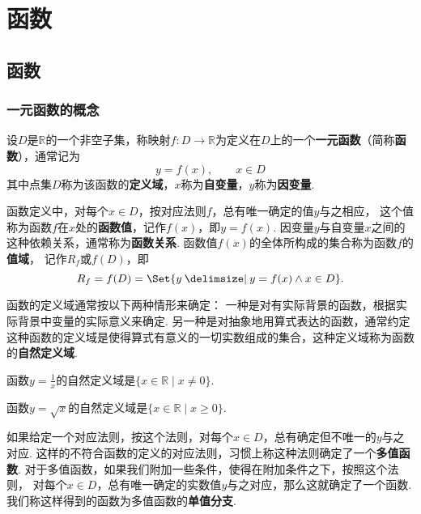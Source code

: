 \chapter{函数}
\section{函数}
\subsection{一元函数的概念}
\begin{definition}
设\(D\)是\(\mathbb{R}\)的一个非空子集，称映射\(f\colon D \to \mathbb{R}\)为定义在\(D\)上的一个\textbf{一元函数}（简称\textbf{函数}），通常记为\[
y = f(x), \qquad x \in D
\]其中点集\(D\)称为该函数的\textbf{定义域}，\(x\)称为\textbf{自变量}，\(y\)称为\textbf{因变量}.

函数定义中，对每个\(x \in D\)，按对应法则\(f\)，总有唯一确定的值\(y\)与之相应，%
这个值称为函数\(f\)在\(x\)处的\textbf{函数值}，记作\(f(x)\)，即\(y=f(x)\).
因变量\(y\)与自变量\(x\)之间的这种依赖关系，通常称为\textbf{函数关系}.
函数值\(f(x)\)的全体所构成的集合称为函数\(f\)的\textbf{值域}，%
记作\(R_f\)或\(f(D)\)，即\[
R_f = f(D) = \Set{ y \given y = f(x) \land x \in D }.
\]

函数的定义域通常按以下两种情形来确定：
一种是对有实际背景的函数，根据实际背景中变量的实际意义来确定.
另一种是对抽象地用算式表达的函数，通常约定这种函数的定义域是使得算式有意义的一切实数组成的集合，这种定义域称为函数的\textbf{自然定义域}.
\end{definition}

\begin{example}
函数\(y = \frac{1}{x}\)的自然定义域是\(\{ x \in \mathbb{R} \mid x \neq 0 \}\).
\end{example}

\begin{example}
函数\(y = \sqrt{x}\)的自然定义域是\(\{ x \in \mathbb{R} \mid x \geqslant 0 \}\).
\end{example}

\begin{definition}
如果给定一个对应法则，按这个法则，对每个\(x \in D\)，总有确定但不唯一的\(y\)与之对应.
这样的不符合函数的定义的对应法则，习惯上称这种法则确定了一个\textbf{多值函数}.
对于多值函数，如果我们附加一些条件，使得在附加条件之下，按照这个法则，%
对每个\(x \in D\)，总有唯一确定的实数值\(y\)与之对应，那么这就确定了一个函数.
我们称这样得到的函数为多值函数的\textbf{单值分支}.
\end{definition}

